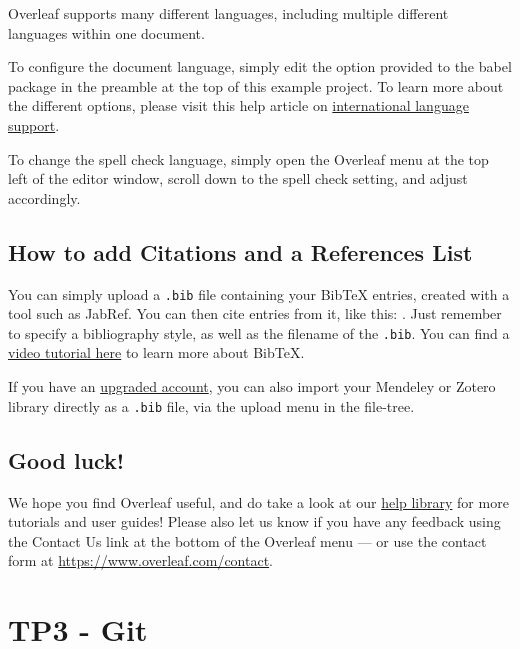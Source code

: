\documentclass{article}
\begin{document}
Overleaf supports many different languages, including multiple different languages within one document.

To configure the document language, simply edit the option provided to the babel package in the preamble at the top of this example project. To learn more about the different options, please visit this help article on \href{https://www.overleaf.com/learn/latex/International_language_support}{international language support}.

To change the spell check language, simply open the Overleaf menu at the top left of the editor window, scroll down to the spell check setting, and adjust accordingly.

\subsection{How to add Citations and a References List}

You can simply upload a \verb|.bib| file containing your BibTeX entries, created with a tool such as JabRef. You can then cite entries from it, like this: \cite{greenwade93}. Just remember to specify a bibliography style, as well as the filename of the \verb|.bib|. You can find a \href{https://www.overleaf.com/help/97-how-to-include-a-bibliography-using-bibtex}{video tutorial here} to learn more about BibTeX.

If you have an \href{https://www.overleaf.com/user/subscription/plans}{upgraded account}, you can also import your Mendeley or Zotero library directly as a \verb|.bib| file, via the upload menu in the file-tree.

\subsection{Good luck!}

We hope you find Overleaf useful, and do take a look at our \href{https://www.overleaf.com/learn}{help library} for more tutorials and user guides! Please also let us know if you have any feedback using the Contact Us link at the bottom of the Overleaf menu --- or use the contact form at \url{https://www.overleaf.com/contact}.

\section{TP3 - Git}

\subsection{}
\subsection{}
\subsection{}



\end{document}
